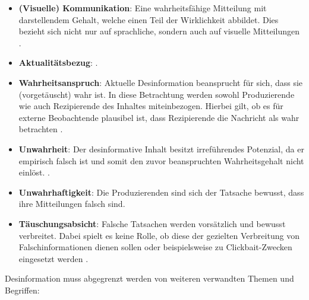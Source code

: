 \documentclass[12pt,a4paper]{article}        %
\begin{document}
\begin{itemize}
  \item \textbf{(Visuelle) Kommunikation}: Eine wahrheitsfähige Mitteilung mit darstellendem Gehalt, welche einen Teil der Wirklichkeit abbildet. Dies bezieht sich nicht nur auf sprachliche, sondern auch auf visuelle Mitteilungen \parencite[151]{marx_fake_2020}.
  \item \textbf{Aktualitätsbezug}:  \parencite[152]{marx_fake_2020}.
  \item \textbf{Wahrheitsanspruch}: Aktuelle Desinformation beansprucht für sich, dass sie (vorgetäuscht) wahr ist. In diese Betrachtung werden sowohl Produzierende wie auch Rezipierende des Inhaltes miteinbezogen. Hierbei gilt, ob es für externe Beobachtende plausibel ist, dass Rezipierende die Nachricht als wahr betrachten \parencite[153]{marx_fake_2020}.
  \item \textbf{Unwahrheit}: Der desinformative Inhalt besitzt irreführendes Potenzial, da er empirisch falsch ist und somit den zuvor beanspruchten Wahrheitsgehalt nicht einlöst. \parencite[154]{marx_fake_2020}.
  \item \textbf{Unwahrhaftigkeit}: Die Produzierenden sind sich der Tatsache bewusst, dass ihre Mitteilungen falsch sind. \parencite[156]{marx_fake_2020}
  \item \textbf{Täuschungsabsicht}: Falsche Tatsachen werden vorsätzlich und bewusst verbreitet. Dabei spielt es keine Rolle, ob diese der gezielten Verbreitung von Falschinformationen dienen sollen oder beispielsweise zu Clickbait-Zwecken eingesetzt werden \parencites[157]{marx_fake_2020}[vgl.\ auch][2]{khan_fake_2021}. 
\end{itemize}

Desinformation muss abgegrenzt werden von weiteren verwandten Themen und Begriffen:
\end{document}
